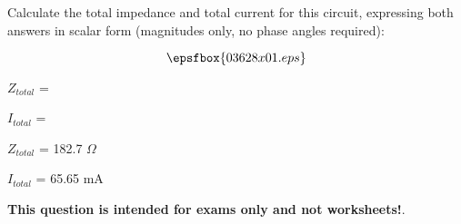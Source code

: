 

Calculate the total impedance and total current for this circuit, expressing both answers in scalar form (magnitudes only, no phase angles required):

$$\epsfbox{03628x01.eps}$$

$Z_{total}$ = 

\vskip 10pt

$I_{total}$ = 







$Z_{total}$ = 182.7 $\Omega$

\vskip 10pt

$I_{total}$ = 65.65 mA







{\bf This question is intended for exams only and not worksheets!}.



